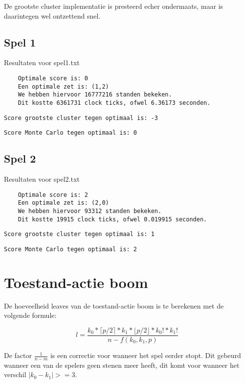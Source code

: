 \documentclass[10pt]{article}
\begin{document}
De grootste cluster implementatie is presteerd echer ondermaats, maar is daarintegen wel ontzettend snel.

\subsection{Spel 1}
Resultaten voor spel1.txt
\begin{lstlisting}
    Optimale score is: 0
    Een optimale zet is: (1,2)
    We hebben hiervoor 16777216 standen bekeken.
    Dit kostte 6361731 clock ticks, ofwel 6.36173 seconden.
\end{lstlisting}


\begin{lstlisting}
Score grootste cluster tegen optimaal is: -3
\end{lstlisting}

\begin{lstlisting}
Score Monte Carlo tegen optimaal is: 0
\end{lstlisting}

\subsection{Spel 2}
Resultaten voor spel2.txt
\begin{lstlisting}
    Optimale score is: 2
    Een optimale zet is: (2,0)
    We hebben hiervoor 93312 standen bekeken.
    Dit kostte 19915 clock ticks, ofwel 0.019915 seconden.
\end{lstlisting}


\begin{lstlisting}
Score grootste cluster tegen optimaal is: 1
\end{lstlisting}

\begin{lstlisting}
Score Monte Carlo tegen optimaal is: 2
\end{lstlisting}

\section{Toestand-actie boom}
De hoeveelheid leaves van de toestand-actie boom is te berekenen met de volgende formule:

\begin{equation}
    l = \frac{k_0 * \lceil p/2 \rceil * k_1 * \lfloor p/2 \rfloor * k_0! * k_1!}{n-f(k_0, k_1, p)} 
\end{equation}

De factor $\frac{1}{n - m}$ is een correctie voor wanneer het spel eerder stopt.
Dit gebeurd wanneer een van de spelers geen stenen meer heeft, dit komt voor wanneer het verschil $|k_0 -k_1| >= 3$.
\end{document}
